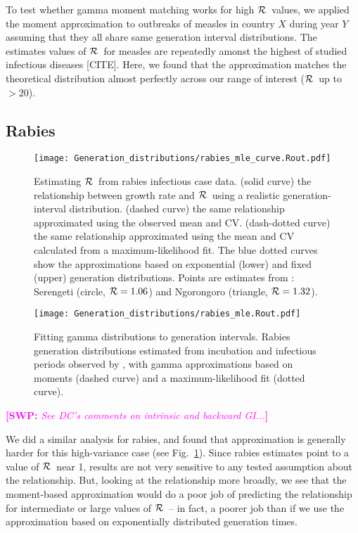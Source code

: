 \documentclass[12pt,]{article}
\newcommand{\RR}{\ensuremath{{\cal R}}}
\newcommand{\fref}[1]{Fig.~\ref{fig:#1}}
\newcommand{\comment}[3]{\textcolor{#1}{\textbf{[#2: }\textit{#3}\textbf{]}}}
\newcommand{\swp}[1]{\comment{magenta}{SWP}{#1}}
\begin{document}
To test whether gamma moment matching works for high \RR\ values, we applied the moment approximation to outbreaks of measles in country $X$ during year $Y$ assuming that they all share same generation interval distributions. The estimates values of \RR\ for measles are repeatedly amonst the highest of studied infectious diseases [CITE]. Here, we found that the approximation matches the theoretical distribution almost perfectly across our range of interest (\RR\ up to $>20$).

\subsection{Rabies}

\begin{figure}[htbp] \centering
	\texttt{[image: Generation\_distributions/rabies\_mle\_curve.Rout.pdf]}
	\caption{Estimating \RR~from rabies infectious case data.
		(solid curve) the relationship between growth rate and \RR~using a realistic generation-interval distribution.
		(dashed curve) the same relationship approximated using the observed mean and CV.
		(dash-dotted curve) the same relationship approximated using the mean and CV calculated from a maximum-likelihood fit.
		The blue dotted curves show the approximations based on exponential (lower) and fixed (upper) generation distributions.
		Points are estimates from \cite{HampDush09}:
		Serengeti (circle, $\RR=1.06$) and Ngorongoro (triangle, $\RR=1.32$).
	}
	\label{fig:rabiesCurve}
\end{figure}

\begin{figure}[htbp] \centering
	\texttt{[image: Generation\_distributions/rabies\_mle.Rout.pdf]}
	\caption{
		Fitting gamma distributions to generation intervals. 
		Rabies generation distributions estimated from incubation and infectious periods observed by \cite{HampDush09}, with gamma approximations based on moments (dashed curve) and a maximum-likelihood fit (dotted curve).
	}
	\label{fig:rabiesHist}
\end{figure}

\swp{See DC's comments on intrinsic and backward GI...}

We did a similar analysis for rabies, and found that approximation is generally harder for this high-variance case (see \fref{rabiesCurve}). Since rabies estimates point to a value of \RR\ near 1, results are not very sensitive to any tested assumption about the relationship. But, looking at the relationship more broadly, we see that the moment-based approximation would do a poor job of predicting the relationship for intermediate or large values of \RR\ -- in fact, a poorer job than if we use the approximation based on exponentially distributed generation times. 
\end{document}
